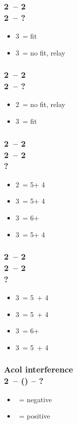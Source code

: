 \documentclass[12pt, a4paper]{article}
\begin{document}
\subsubsection*{2\clubs\ -- 2\diams \\ 2\hearts\ -- ?}
\begin{itemize}
    \item 3\hearts\ = fit
    \item 3\spades\ = no fit, relay
\end{itemize}

\subsubsection*{2\clubs\ -- 2\diams \\ 2\spades\ -- ?}
\begin{itemize}
    \item 2\nt\ = no fit, relay
    \item 3\spades\ = fit
\end{itemize}

\subsubsection*{2\clubs\ -- 2\diams \\ 
                2\hearts\ -- 2\spades \\
                ?}
\begin{itemize}
    \item 2\nt\ = 5\hearts + 4\clubs
    \item 3\clubs\ = 5\hearts + 4\diams
    \item 3\diams\ = 6+\hearts
    \item 3\hearts\ = 5\hearts + 4\spades
\end{itemize}

\subsubsection*{2\clubs\ -- 2\diams \\ 
                2\spades\ -- 2\ntx \\
                ?}
\begin{itemize}
    \item 3\clubs\ = 5\spades\ + 4\diams
    \item 3\diams\ = 5\spades\ + 4\hearts
    \item 3\hearts\ = 6+\spades
    \item 3\spades\ = 5\spades\ + 4\clubs
\end{itemize}

\subsubsection*{Acol interference\\
                2\clubs\ -- () -- ?}
\begin{itemize}
    \item \dbl\ = negative
    \item \pass\ = positive
\end{itemize}

\end{document}
